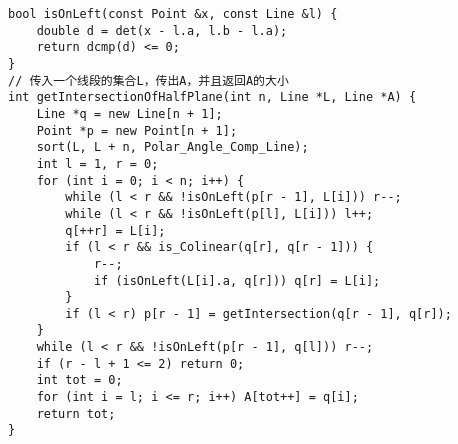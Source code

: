 \begin{lstlisting}
bool isOnLeft(const Point &x, const Line &l) {
	double d = det(x - l.a, l.b - l.a);
	return dcmp(d) <= 0;
}
// 传入一个线段的集合L，传出A，并且返回A的大小
int getIntersectionOfHalfPlane(int n, Line *L, Line *A) {
	Line *q = new Line[n + 1];
	Point *p = new Point[n + 1];
	sort(L, L + n, Polar_Angle_Comp_Line);
	int l = 1, r = 0;
	for (int i = 0; i < n; i++) {
		while (l < r && !isOnLeft(p[r - 1], L[i])) r--;
		while (l < r && !isOnLeft(p[l], L[i])) l++;
		q[++r] = L[i];
		if (l < r && is_Colinear(q[r], q[r - 1])) {
			r--;
			if (isOnLeft(L[i].a, q[r])) q[r] = L[i];
		}
		if (l < r) p[r - 1] = getIntersection(q[r - 1], q[r]);
	}
	while (l < r && !isOnLeft(p[r - 1], q[l])) r--;
	if (r - l + 1 <= 2) return 0;
	int tot = 0;
	for (int i = l; i <= r; i++) A[tot++] = q[i];
	return tot;
}
\end{lstlisting}
